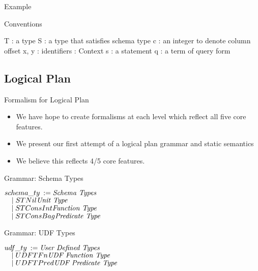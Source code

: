 \begin{frame}{Example}

\begin{frame}{Conventions}
\centering
	\begin{flushleft}
		T : a type\newline
		S : a type that satisfies schema type\newline
		c : an integer to denote column offset\newline
		x, y : identifiers\newline
		\textGamma \: : Context\newline
 		s : a statement\newline
 		q : a term of query form\newline 
	\end{flushleft}
\end{frame}

\subsection{Logical Plan}

\begin{frame}{Formalism for Logical Plan}
\begin{itemize}
	\item We have hope to create formalisms at each level which reflect all five
	core features.
	\item We present our first attempt of a logical plan grammar and static
	semantics
	\item We believe this reflects 4/5 core features.
\end{itemize}
\end{frame}

\begin{frame}{Grammar: Schema Types}
\centering
	\begin{flushleft}
	$ schema\_ty \::= \hfill \textnormal{\emph{Schema Types}}\hfill$\\
	$ \quad \mid STNil\hfill \textnormal{\emph{Unit Type}}\hfill$\\
   	$ \quad \mid STConsInt \hfill \textnormal{\emph{Function Type}}\hfill$\\
     	$ \quad \mid STConsBag \hfill \textnormal{\emph{Predicate Type}}\hfill$\\
	\end{flushleft}
\end{frame}

\begin{frame}{Grammar: UDF Types}
\centering
	\begin{flushleft}
	$ udf\_ty \::= \hfill \textnormal{\emph{User Defined Types}}\hfill$\\
	$ \quad \mid UDFTFn\hfill \textnormal{\emph{UDF Function Type}}\hfill$\\
   	$ \quad \mid UDFTPred \hfill \textnormal{\emph{UDF Predicate Type}}\hfill$\\
	\end{flushleft}
\end{frame}


\end{frame}
